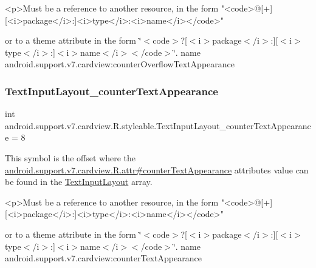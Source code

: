 \begin{DoxyVerb}      <p>Must be a reference to another resource, in the form "<code>@[+][<i>package</i>:]<i>type</i>:<i>name</i></code>"
\end{DoxyVerb}
 or to a theme attribute in the form \char`\"{}$<$code$>$?\mbox{[}$<$i$>$package$<$/i$>$\+:\mbox{]}\mbox{[}$<$i$>$type$<$/i$>$\+:\mbox{]}$<$i$>$name$<$/i$>$$<$/code$>$\char`\"{}.  name android.\+support.\+v7.\+cardview\+:counter\+Overflow\+Text\+Appearance \mbox{\label{classandroid_1_1support_1_1v7_1_1cardview_1_1R_1_1styleable_a4f48ef46d74bceb992c4f711156a4d5e}} 
\subsubsection{\texorpdfstring{Text\+Input\+Layout\+\_\+counter\+Text\+Appearance}{TextInputLayout\_counterTextAppearance}}
{\footnotesize\ttfamily int android.\+support.\+v7.\+cardview.\+R.\+styleable.\+Text\+Input\+Layout\+\_\+counter\+Text\+Appearance = 8\hspace{0.3cm}{\ttfamily [static]}}

This symbol is the offset where the \hyperlink{classandroid_1_1support_1_1v7_1_1cardview_1_1R_1_1attr_aecc7241edce89e54265193066cf7bd25}{android.\+support.\+v7.\+cardview.\+R.\+attr\#counter\+Text\+Appearance} attribute\textquotesingle{}s value can be found in the \hyperlink{classandroid_1_1support_1_1v7_1_1cardview_1_1R_1_1styleable_a9b23c31ffaf354f0f5cc4b82392ef6a4}{Text\+Input\+Layout} array.

\begin{DoxyVerb}      <p>Must be a reference to another resource, in the form "<code>@[+][<i>package</i>:]<i>type</i>:<i>name</i></code>"
\end{DoxyVerb}
 or to a theme attribute in the form \char`\"{}$<$code$>$?\mbox{[}$<$i$>$package$<$/i$>$\+:\mbox{]}\mbox{[}$<$i$>$type$<$/i$>$\+:\mbox{]}$<$i$>$name$<$/i$>$$<$/code$>$\char`\"{}.  name android.\+support.\+v7.\+cardview\+:counter\+Text\+Appearance \mbox{\label{classandroid_1_1support_1_1v7_1_1cardview_1_1R_1_1styleable_a8a5e8ed251b3ba0a1edc2d97db3fc83a}} 

